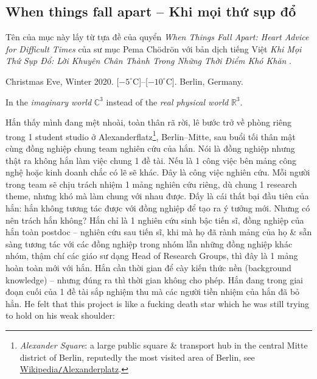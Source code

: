 \documentclass[12pt]{article}
\begin{document}
\subsection{When things fall apart -- Khi mọi thứ sụp đổ}
Tên của mục này lấy từ tựa đề của quyển {\it When Things Fall Apart: Heart Advice for Difficult Times} \cite{Chodron2002} của sư mục {\sc Pema Ch\"odr\"on} với bản dịch tiếng Việt {\it Khi Mọi Thứ Sụp Đổ: Lời Khuyên Chân Thành Trong Những Thời Điểm Khó Khăn} \cite{Chodron2021}.
\begin{flushright}
	Christmas Eve, Winter 2020. [$-5^\circ$C]--[$-10^\circ$C]. Berlin, Germany.
	
	In the {\it imaginary world} $\mathbb{C}^3$ instead of the {\it real physical world} $\mathbb{R}^3$.
\end{flushright}
Hắn thấy mình đang mệt nhoài, toàn thân rã rời, lê bước trở về phòng riêng trong 1 student studio ở Alexanderflatz\footnote{ {\it Alexander Square}: a large public square \& transport hub in the central Mitte district of Berlin, reputedly the most visited area of Berlin, see \href{https://en.wikipedia.org/wiki/Alexanderplatz}{Wikipedia{\tt/}Alexanderplatz}.}, Berlin--Mitte, sau buổi tối thân mật cùng đồng nghiệp chung team nghiên cứu của hắn. Nói là đồng nghiệp nhưng thật ra không hắn làm việc chung 1 đề tài. Nếu là 1 công việc bên mảng công nghệ hoặc kinh doanh chắc có lẽ sẽ khác. Đây là công việc nghiên cứu. Mỗi người trong team sẽ chịu trách nhiệm 1 mảng nghiên cứu riêng, dù chung 1 research theme, nhưng khó mà làm chung với nhau được. Đấy là cái thất bại đầu tiên của hắn: hắn không tương tác được với đồng nghiệp để tạo ra ý tưởng mới. Nhưng có nên trách hắn không? Hắn chỉ là 1 nghiên cứu sinh bậc tiến sĩ, đồng nghiệp của hắn toàn postdoc -- nghiên cứu sau tiến sĩ, khi mà họ đã rành mảng của họ \& sẵn sàng tương tác với các đồng nghiệp trong nhóm lẫn những đồng nghiệp khác nhóm, thậm chí các giáo sư dạng Head of Research Groups, thì đây là 1 mảng hoàn toàn mới với hắn. Hắn cần thời gian để cày kiến thức nền (background knowledge) -- nhưng đúng ra thì thời gian không cho phép. Hắn đang trong giai đoạn cuối của 1 đề tài sắp nghiệm thu mà các người tiền nhiệm của hắn đã bỏ hẳn. He felt that this project is like a fucking death star which he was still trying to hold on his weak shoulder:
\end{document}
